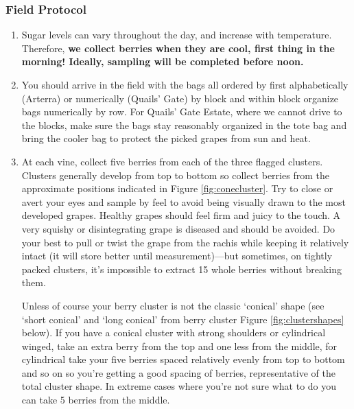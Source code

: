 \documentclass[11pt,letter]{article}
\begin{document}
\subsubsection{Field Protocol}
\begin{enumerate}
\item Sugar levels can vary throughout the day, and increase with temperature. Therefore, {\bf we collect berries when they are cool, first thing in the morning! Ideally, sampling will be completed before noon.}

\item You should arrive in the field with the bags all ordered by first alphabetically (Arterra) or numerically (Quails' Gate) by block and within block organize bags numerically by row. For Quails' Gate Estate, where we cannot drive to the blocks, make sure the bags stay reasonably organized in the tote bag and bring the cooler bag to protect the picked grapes from sun and heat. %

\item At each vine, collect five berries from each of the three flagged clusters. Clusters generally develop from top to bottom so collect berries from the approximate positions indicated in Figure \ref{fig:conecluster}. Try to close or avert your eyes and sample by feel to avoid being visually drawn to the most developed grapes. Healthy grapes should feel firm and juicy to the touch. A very squishy or disintegrating grape is diseased and should be avoided. Do your best to pull or twist the grape from the rachis while keeping it relatively intact (it will store better until measurement)---but sometimes, on tightly packed clusters, it’s impossible to extract 15 whole berries without breaking them. 

Unless of course your berry cluster is not the classic ‘conical’ shape (see ‘short conical’ and ‘long conical’ from berry cluster Figure \ref{fig:clustershapes} below). If you have a conical cluster with strong shoulders or cylindrical winged, take an extra berry from the top and one less from the middle, for cylindrical take your five berries spaced relatively evenly from top to bottom and so on so you’re getting a good spacing of berries, representative of the total cluster shape. In extreme cases where you’re not sure what to do you can take 5 berries from the middle.


\end{enumerate}
\end{document}
